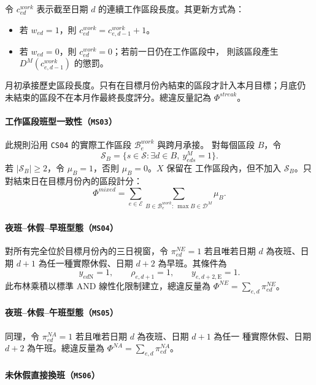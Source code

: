 \documentclass[12pt]{article}
\begin{document}
令 \(c^{work}_{ed}\) 表示截至日期 \(d\) 的連續工作區段長度。其更新方式為：
\begin{itemize}
  \item 若 \(w_{ed}=1\)，則 \(c^{work}_{ed}=c^{work}_{e,d-1}+1\)。
  \item 若 \(w_{ed}=0\)，則 \(c^{work}_{ed}=0\)；若前一日仍在工作區段中，
    則該區段產生 \(D^M(c^{work}_{e,d-1})\) 的懲罰。
\end{itemize}

月初承接歷史區段長度。只有在目標月份內結束的區段才計入本月目標；月底仍
未結束的區段不在本月作最終長度評分。總違反量記為 \(\Phi^{streak}\)。

\paragraph{工作區段班型一致性（\texttt{MS03}）}
此規則沿用 \texttt{CS04} 的實際工作區段 \(\mathcal B^{work}_e\) 與跨月承接。
對每個區段 \(B\)，令
\[
  \mathcal S_B=\{s\in\mathcal S:\exists d\in B,\ y^M_{eds}=1\}.
\]
若 \(|\mathcal S_B|\geq2\)，令 \(\mu_B=1\)，否則 \(\mu_B=0\)。\(X\) 保留在
工作區段內，但不加入 \(\mathcal S_B\)。只對結束日在目標月份內的區段計分：
\[
  \Phi^{mixed}
  =\sum_{e\in\mathcal E}
  \sum_{B\in\mathcal B^{work}_e:\ \max B\in\mathcal D^M}\mu_B.
\]

\paragraph{夜班--休假--早班型態（\texttt{MS04}）}

對所有完全位於目標月份內的三日視窗，令 \(\pi^{NE}_{ed}=1\) 若且唯若日期
\(d\) 為夜班、日期 \(d+1\) 為任一種實際休假、日期 \(d+2\) 為早班。其條件為
\[
  y_{ed\mathrm{N}}=1,
  \qquad
  \rho_{e,d+1}=1,
  \qquad
  y_{e,d+2,\mathrm{E}}=1.
\]
此布林乘積以標準 AND 線性化限制建立，總違反量為
\(\Phi^{NE}=\sum_{e,d}\pi^{NE}_{ed}\)。

\paragraph{夜班--休假--午班型態（\texttt{MS05}）}

同理，令 \(\pi^{NA}_{ed}=1\) 若且唯若日期 \(d\) 為夜班、日期 \(d+1\) 為任一
種實際休假、日期 \(d+2\) 為午班。總違反量為
\(\Phi^{NA}=\sum_{e,d}\pi^{NA}_{ed}\)。

\paragraph{未休假直接換班（\texttt{MS06}）}
\end{document}
